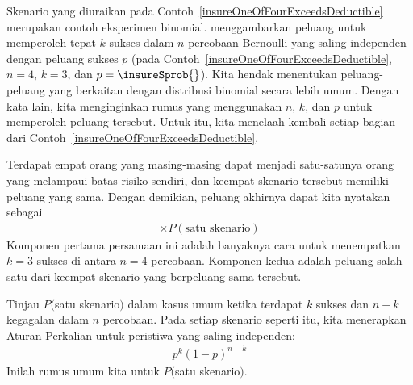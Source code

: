 Skenario yang diuraikan pada
Contoh~\ref{insureOneOfFourExceedsDeductible} merupakan contoh
eksperimen binomial. 
menggambarkan peluang untuk memperoleh tepat $k$ sukses dalam $n$
percobaan Bernoulli yang saling independen dengan peluang sukses $p$
(pada Contoh~\ref{insureOneOfFourExceedsDeductible},
$n=4$, $k=3$, dan $p=\insureSprob{}$).
Kita hendak menentukan peluang-peluang yang berkaitan dengan distribusi
binomial secara lebih umum. Dengan kata lain, kita menginginkan rumus
yang menggunakan $n$, $k$, dan $p$ untuk memperoleh peluang tersebut.
Untuk itu, kita menelaah kembali setiap bagian dari
Contoh~\ref{insureOneOfFourExceedsDeductible}.

Terdapat empat orang yang masing-masing dapat menjadi satu-satunya orang
yang melampaui batas risiko sendiri, dan keempat skenario tersebut
memiliki peluang yang sama. Dengan demikian, peluang akhirnya dapat kita
nyatakan sebagai
\begin{align*}
[\text{\# skenario}] \times P(\text{satu skenario})
\end{align*}
Komponen pertama persamaan ini adalah banyaknya cara untuk menempatkan
$k=3$ sukses di antara $n=4$ percobaan. Komponen kedua adalah peluang
salah satu dari keempat skenario yang berpeluang sama tersebut.

\D{\newpage}

Tinjau $P($satu skenario$)$ dalam kasus umum ketika terdapat $k$ sukses
dan $n-k$ kegagalan dalam $n$ percobaan. Pada setiap skenario seperti itu,
kita menerapkan Aturan Perkalian untuk peristiwa yang saling independen:
\begin{align*}
p^k (1 - p)^{n - k}
\end{align*}
Inilah rumus umum kita untuk $P($satu skenario$)$.

